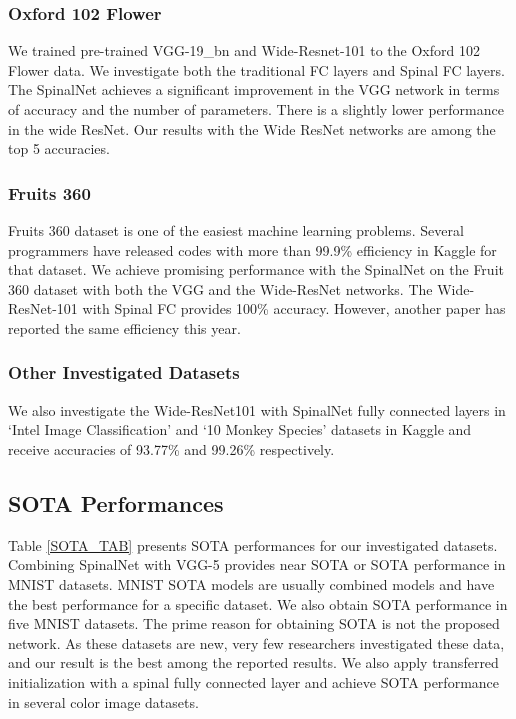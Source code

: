 \documentclass[journal]{IEEEtran}
\begin{document}
\subsubsection{Oxford 102 Flower}
We trained pre-trained VGG-19\_bn and Wide-Resnet-101 to the Oxford 102 Flower data. We investigate both the traditional FC layers and Spinal FC layers. The SpinalNet achieves a significant improvement in the VGG network in terms of accuracy and the number of parameters. There is a slightly lower performance in the wide ResNet. Our results with the Wide ResNet networks are among the top 5 accuracies.

\subsubsection{Fruits 360}
Fruits 360 dataset is one of the easiest machine learning problems. Several programmers have released codes with more than 99.9\% efficiency in Kaggle for that dataset. We achieve promising performance with the SpinalNet on the Fruit 360 dataset with both the VGG and the Wide-ResNet networks. The Wide-ResNet-101 with Spinal FC provides 100\% accuracy. However, another paper has reported the same efficiency this year.

\subsubsection{Other Investigated Datasets}
We also investigate the Wide-ResNet101 with SpinalNet fully connected layers in `Intel Image Classification' and `10 Monkey Species' datasets in Kaggle and receive accuracies of 93.77\% and 99.26\% respectively.

\subsection{SOTA Performances}
Table \ref{SOTA_TAB} presents SOTA performances for our investigated datasets. Combining SpinalNet with VGG-5 provides near SOTA or SOTA performance in MNIST datasets. MNIST SOTA models are usually combined models and have the best performance for a specific dataset. We also obtain SOTA performance in five MNIST datasets. The prime reason for obtaining SOTA is not the proposed network. As these datasets are new, very few researchers investigated these data, and our result is the best among the reported results. We also apply transferred initialization with a spinal fully connected layer and achieve SOTA performance in several color image datasets.
\end{document}
